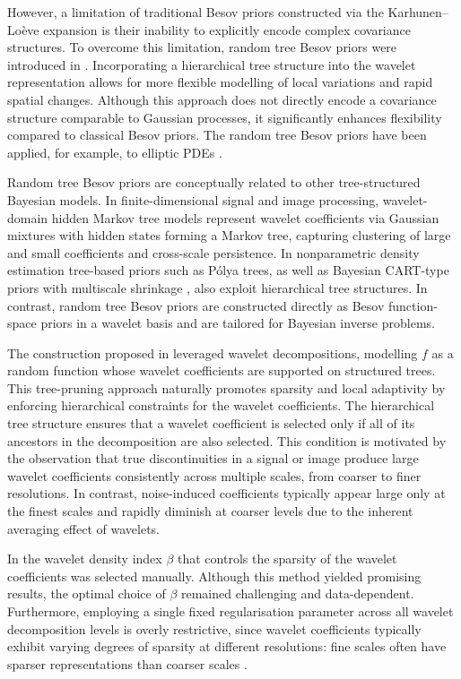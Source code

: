 \documentclass[11pt,a4paper]{article}
\begin{document}
However, a limitation of traditional Besov priors constructed via the Karhunen-- Loève expansion is their inability to explicitly encode complex covariance structures. To overcome this limitation, random tree Besov priors were introduced in \cite{Kekkonen2023}. Incorporating a hierarchical tree structure into the wavelet representation allows for more flexible modelling of local variations and rapid spatial changes. Although this approach does not directly encode a covariance structure comparable to Gaussian processes, it significantly enhances flexibility compared to classical Besov priors. The random tree Besov priors have been applied, for example, to elliptic PDEs \cite{Schwab2024, Stein2023}. 

Random tree Besov priors are conceptually related to other tree-structured Bayesian models. In finite-dimensional signal and image processing, wavelet-domain hidden Markov tree models \cite{Crouse2002,Romberg2001} represent wavelet coefficients via Gaussian mixtures with hidden states forming a Markov tree, capturing clustering of large and small coefficients and cross-scale persistence. In nonparametric density estimation tree-based priors such as Pólya trees\cite{Castillo2017, Castillo2021, Castillo2022}, as well as Bayesian CART-type priors with multiscale shrinkage \cite{Castillo2019}, also exploit hierarchical tree structures. In contrast, random tree Besov priors are constructed directly as Besov function-space priors in a wavelet basis and are tailored for Bayesian inverse problems.

The construction proposed in \cite{Kekkonen2023} leveraged wavelet decompositions, modelling $f$ as a random function whose wavelet coefficients are supported on structured trees. This tree-pruning approach naturally promotes sparsity and local adaptivity by enforcing hierarchical constraints for the wavelet coefficients. The hierarchical tree structure ensures that a wavelet coefficient is selected only if all of its ancestors in the decomposition are also selected. This condition is motivated by the observation that true discontinuities in a signal or image produce large wavelet coefficients consistently across multiple scales, from coarser to finer resolutions. In contrast, noise-induced coefficients typically appear large only at the finest scales and rapidly diminish at coarser levels due to the inherent averaging effect of wavelets.

In \cite{Kekkonen2023} the wavelet density index $\beta$ that controls the sparsity of the wavelet coefficients was selected manually. Although this method yielded promising results, the optimal choice of $\beta$ remained challenging and data-dependent. Furthermore, employing a single fixed regularisation parameter across all wavelet decomposition levels is overly restrictive, since wavelet coefficients typically exhibit varying degrees of sparsity at different resolutions: fine scales often have sparser representations than coarser scales \cite{Adcock2017}.
\end{document}
